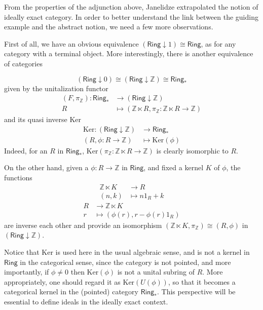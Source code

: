 From the properties of the adjunction above, Janelidze extrapolated the
notion of ideally exact category. In order to better understand the link
between the guiding example and the abstract notion, we need a few more
observations.

First of all, we have an obvious equivalence $(\mathsf{Ring} \downarrow 1)\cong \mathsf{Ring}$, as for
any category with a terminal object. More interestingly, there is another equivalence of categories

\[
(\mathsf{Ring} \downarrow 0)\cong (\mathsf{Ring} \downarrow \mathbb{Z}) \cong \mathsf{Ring_*}
\]
given by the unitalization functor 
\begin{align*}
    (F,\pi_\mathbb{Z}) : \mathsf{Ring_*} &\to (\mathsf{Ring} \downarrow \mathbb{Z})\\
    R &\mapsto (\mathbb{Z} \ltimes R, \pi_\mathbb{Z}:\mathbb{Z} \ltimes R \to \mathbb{Z})
\end{align*}
and its quasi inverse $\mathrm{Ker}$
\begin{align*}
    \mathrm{Ker} : (\mathsf{Ring} \downarrow \mathbb{Z}) &\to \mathsf{Ring_*}\\
    (R,\phi:R \to \mathbb{Z}) &\mapsto \mathrm{Ker}(\phi) 
\end{align*}
Indeed, for an $R$ in $\mathsf{Ring_*}$, $\mathrm{Ker}(\pi_\mathbb{Z} : \mathbb{Z} \ltimes R \to \mathbb{Z})$
is clearly isomorphic to $R$.

On the other hand, given a $\phi: R \to \mathbb{Z}$ in $\mathsf{Ring}$, 
and fixed a kernel $K$ of $\phi$, the functions
\begin{align*}
    \mathbb{Z} \ltimes K &\to R \\
    (n,k) &\mapsto n1_R + k
\end{align*}
\begin{align*}
    R &\to \mathbb{Z} \ltimes K \\
    r &\mapsto (\phi(r), r - \phi(r)1_R)
\end{align*}
are inverse each other and provide an isomorphism
$(\mathbb{Z} \ltimes K, \pi_\mathbb{Z}) \cong (R,\phi)$
in $(\mathsf{Ring} \downarrow \mathbb{Z})$.

Notice that $\mathrm{Ker}$ is used here in the usual algebraic sense,
and is not a kernel in $\mathsf{Ring}$ in the categorical sense, since the category is not
pointed, and more importantly, if $\phi \neq 0$ then $\mathrm{Ker}(\phi)$ is not a unital subring of $R$. More appropriately, one should regard it as $\mathrm{Ker}(U(\phi))$, so that it becomes
a categorical kernel in the
(pointed) category $\mathsf{Ring_*}$. This perspective will be
essential to define ideals in the ideally exact context.

